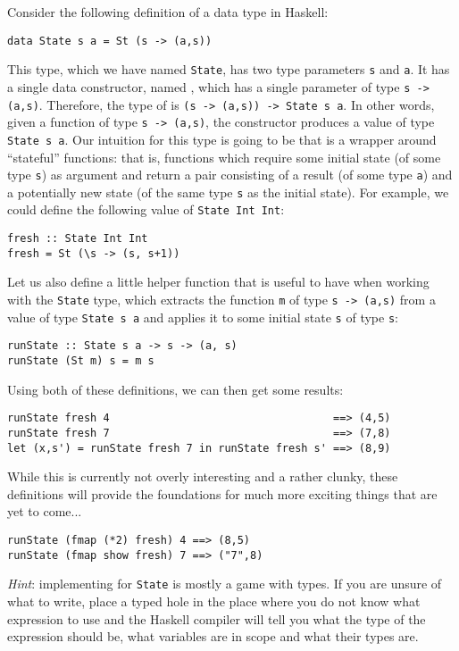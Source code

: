 Consider the following definition of a data type in Haskell:
\begin{verbatim}
data State s a = St (s -> (a,s))
\end{verbatim}
This type, which we have named \texttt{\small State}, has two type parameters \texttt{\small s} and \texttt{\small a}. It has a single data constructor, named , which has a single parameter of type \texttt{\small s -> (a,s)}. Therefore, the type of  is \texttt{\small (s -> (a,s)) -> State s a}. In other words, given a function of type \texttt{\small s -> (a,s)}, the  constructor produces a value of type \texttt{\small State s a}. Our intuition for this type is going to be that  is a wrapper around ``stateful'' functions: that is, functions which require some initial state (of some type \texttt{\small s}) as argument and return a pair consisting of a result (of some type \texttt{\small a}) and a potentially new state (of the same type \texttt{\small s} as the initial state). For example, we could define the following value of \texttt{\small State Int Int}:
\begin{verbatim}
fresh :: State Int Int 
fresh = St (\s -> (s, s+1))
\end{verbatim}
Let us also define a little helper function that is useful to have when working with the \texttt{\small State} type, which extracts the function \texttt{\small m} of type \texttt{\small s -> (a,s)} from a value of type \texttt{\small State s a} and applies it to some initial state \texttt{\small s} of type \texttt{\small s}:
\begin{verbatim}
runState :: State s a -> s -> (a, s)
runState (St m) s = m s
\end{verbatim}
Using both of these definitions, we can then get some results:
\begin{verbatim}
runState fresh 4                                   ==> (4,5)
runState fresh 7                                   ==> (7,8)
let (x,s') = runState fresh 7 in runState fresh s' ==> (8,9)
\end{verbatim}
While this is currently not overly interesting and a rather clunky, these definitions will provide the foundations for much more exciting things that are yet to come...

\begin{verbatim}
runState (fmap (*2) fresh) 4 ==> (8,5) 
runState (fmap show fresh) 7 ==> ("7",8)
\end{verbatim}
\emph{Hint}: implementing  for \texttt{\small State} is mostly a game with types. If you are unsure of what to write, place a typed hole \haskellIn{_} in the place where you do not know what expression to use and the Haskell compiler will tell you what the type of the expression should be, what variables are in scope and what their types are.

